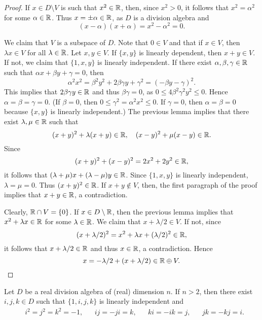 \begin{proof}
	If $x\in D\setminus V$ is such that $x^2\in\mathbb{R}$, 
    then, since $x^2>0$, it follows
	that $x^2=\alpha^2$ for some $\alpha\in\mathbb{R}$. Thus $x=\pm\alpha\in\mathbb{R}$, as $D$
	is a division algebra and 
 \[
 (x-\alpha)(x+\alpha)=x^2-\alpha^2=0.
 \]

	We claim that $V$ is a subspace of $D$.  Note that $0\in V$ and 
	that if $x\in V$, then $\lambda x\in V$ for all $\lambda\in\mathbb{R}$.  Let 
	$x,y\in V$. If $\{x,y\}$ is linearly dependent, then $x+y\in V$.
	If not, we claim that 
	$\{1,x,y\}$ is linearly independent. If there exist 
	$\alpha,\beta,\gamma\in\mathbb{R}$ such that $\alpha x+\beta y+\gamma=0$, then 
	\[
	\alpha^2x^2=\beta^2y^2+2\beta\gamma y+\gamma^2=(-\beta y-\gamma)^2.
	\]
	This implies that $2\beta\gamma y\in\mathbb{R}$ and thus $\beta\gamma=0$, as
        $0\leq 4\beta^2\gamma^2y^2\leq 0$. Hence 
	$\alpha=\beta=\gamma=0$. (If $\beta=0$, then $0\leq\gamma^2=\alpha^2x^2\leq 0$. If $\gamma=0$, then $\alpha=\beta=0$ because $\{x,y\}$ is linearly independent.) The previous lemma implies that there exist 
	$\lambda,\mu\in\mathbb{R}$ such that 
	\[
		(x+y)^2+\lambda(x+y)\in\mathbb{R},\quad
		(x-y)^2+\mu(x-y)\in\mathbb{R}.
	\]
	Since 
	\[
		(x+y)^2+(x-y)^2=2x^2+2y^2\in\mathbb{R},
	\]
	it follows that $(\lambda+\mu)x+(\lambda-\mu)y\in\mathbb{R}$. Since  $\{1,x,y\}$ is linearly 
	independent, 
	$\lambda=\mu=0$. Thus $(x+y)^2\in\mathbb{R}$. If 
	$x+y\not\in V$, then, the first paragraph of the proof implies that 
	$x+y\in\mathbb{R}$, a contradiction. 

	Clearly, $\mathbb{R}\cap V=\{0\}$. If $x\in D\setminus\mathbb{R}$, then the previous lemma 
	implies that $x^2+\lambda x\in\mathbb{R}$ for some 
	$\lambda\in\mathbb{R}$. We claim that $x+\lambda/2\in V$. If not, since 
	\[
	(x+\lambda/2)^2=x^2+\lambda x+(\lambda/2)^2\in\mathbb{R},
	\]
	it follows that $x+\lambda/2\in\mathbb{R}$ and thus $x\in\mathbb{R}$, a contradiction. Hence 
	\[
 x=-\lambda/2+(x+\lambda/2)\in\mathbb{R}\oplus V.\qedhere
 \]
\end{proof}

\begin{lemma}
	\label{lem:trick_frobenius3}
	Let $D$ be a real division algebra of (real) dimension $n$. If $n>2$, then
	there exist $i,j,k\in D$ such that $\{1,i,j,k\}$ is linearly independent and 
	\begin{align}
	\label{eq:H}
	&i^2=j^2=k^2=-1, && ij=-ji=k, && ki=-ik=j, && jk=-kj=i.
	\end{align}
\end{lemma}

